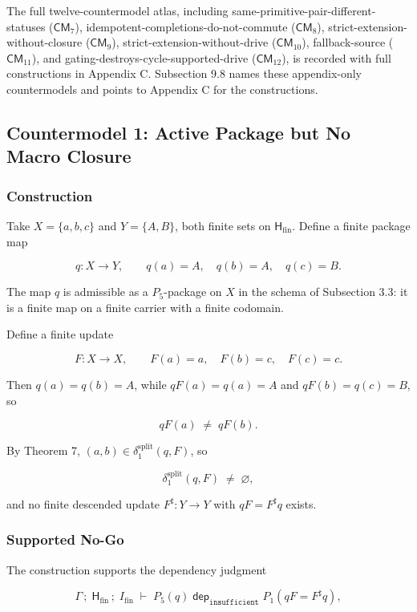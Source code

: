 \documentclass[11pt]{article}
\theoremstyle{definition}
\begin{document}
The full twelve-countermodel atlas, including same-primitive-pair-different-statuses (\(\mathsf{CM}_7\)), idempotent-completions-do-not-commute (\(\mathsf{CM}_8\)), strict-extension-without-closure (\(\mathsf{CM}_9\)), strict-extension-without-drive (\(\mathsf{CM}_{10}\)), fallback-source (\(\mathsf{CM}_{11}\)), and gating-destroys-cycle-supported-drive (\(\mathsf{CM}_{12}\)), is recorded with full constructions in Appendix C. Subsection 9.8 names these appendix-only countermodels and points to Appendix C for the constructions.

\subsection{Countermodel 1: Active Package but No Macro Closure}

\subsubsection{Construction}

Take \(X=\{a,b,c\}\) and \(Y=\{A,B\}\), both finite sets on \(\mathsf H_{\mathrm{fin}}\). Define a finite package map

\[
q:X\to Y,\qquad q(a)=A,\quad q(b)=A,\quad q(c)=B.
\]

The map \(q\) is admissible as a \(P_5\)-package on \(X\) in the schema of Subsection 3.3: it is a finite map on a finite carrier with a finite codomain.

Define a finite update

\[
F:X\to X,\qquad F(a)=a,\quad F(b)=c,\quad F(c)=c.
\]

Then \(q(a)=q(b)=A\), while \(qF(a)=q(a)=A\) and \(qF(b)=q(c)=B\), so

\[
qF(a)\;\neq\;qF(b).
\]

By Theorem 7, \((a,b)\in\delta_1^{\mathrm{split}}(q,F)\), so

\[
\delta_1^{\mathrm{split}}(q,F)\;\neq\;\varnothing,
\]

and no finite descended update \(F^\sharp:Y\to Y\) with \(qF=F^\sharp q\) exists.

\subsubsection{Supported No-Go}

The construction supports the dependency judgment

\[
\Gamma\,;\;\mathsf H_{\mathrm{fin}}\,;\;I_{\mathrm{fin}}\;\vdash\;P_5(q)\;\mathrel{\mathsf{dep}_{\texttt{insufficient}}}\;P_1(qF=F^\sharp q),
\]
\end{document}
